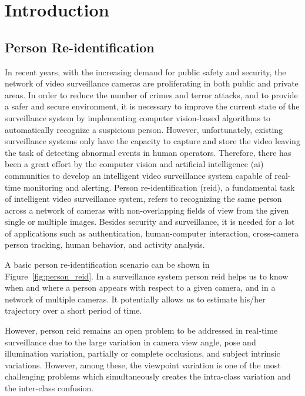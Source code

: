 \chapter{Introduction}\label{intro}
\section{Person Re-identification}
In recent years, with the increasing demand for public safety and security, the network of video surveillance cameras are proliferating in both public and private areas. In order to reduce the number of crimes and terror attacks, and to provide a safer and secure environment, it is necessary to improve the current state of the surveillance system by implementing computer vision-based algorithms to automatically recognize a suspicious person. However, unfortunately, existing surveillance systems only have the capacity to capture and store the video leaving the task of detecting abnormal events in human operators. Therefore, there has been a great effort by the computer vision and artificial intelligence (\gls{ai}) communities to develop an intelligent video surveillance system capable of real-time monitoring and alerting. Person re-identification (\gls{reid}), a fundamental task of intelligent video surveillance system, refers to recognizing the same person across a network of cameras with non-overlapping fields of view from the given single or multiple images. Besides security and surveillance, it is needed for a lot of applications such as authentication, human-computer interaction, cross-camera person tracking, human behavior, and activity analysis. 

A basic person re-identification scenario can be shown in Figure~\ref{fig:person_reid}. In a surveillance system person \gls{reid} helps us to know when and where a person appears with respect to a given camera, and in a network of multiple cameras. It potentially allows us to estimate his/her trajectory over a short period of time. 

However, person \gls{reid} remains an open problem to be addressed in real-time surveillance due to the large variation in camera view angle, pose and illumination variation, partially or complete occlusions, and subject intrinsic variations. However, among these, the viewpoint variation is one of the most challenging problems which simultaneously creates the intra-class variation and the inter-class confusion.

